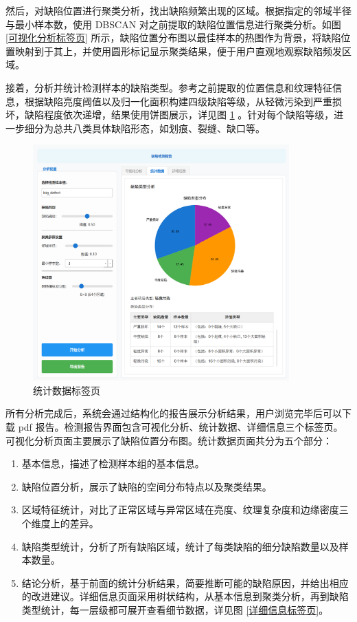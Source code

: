 \documentclass[
  ]{njuthesis}
\begin{document}
然后，对缺陷位置进行聚类分析，找出缺陷频繁出现的区域。根据指定的邻域半径与最小样本数，使用 DBSCAN 对之前提取的缺陷位置信息进行聚类分析。如图 \ref{可视化分析标签页} 所示，缺陷位置分布图以最佳样本的热图作为背景，将缺陷位置映射到于其上，并使用圆形标记显示聚类结果，便于用户直观地观察缺陷频发区域。

接着，分析并统计检测样本的缺陷类型。参考之前提取的位置信息和纹理特征信息，根据缺陷亮度阈值以及归一化面积构建四级缺陷等级，从轻微污染到严重损坏，缺陷程度依次递增，结果使用饼图展示，详见图 \ref{统计数据标签页} 。针对每个缺陷等级，进一步细分为总共八类具体缺陷形态，如划痕、裂缝、缺口等。

\begin{figure}[htb]
    \centering
    \includegraphics[width=0.88\textwidth]{images/统计数据标签页.png}
    \caption{统计数据标签页}
    \label{统计数据标签页}
\end{figure}

所有分析完成后，系统会通过结构化的报告展示分析结果，用户浏览完毕后可以下载 pdf 报告。检测报告界面包含可视化分析、统计数据、详细信息三个标签页。可视化分析页面主要展示了缺陷位置分布图。统计数据页面共分为五个部分：

\begin{enumerate}
    \item 基本信息，描述了检测样本组的基本信息。
    \item 缺陷位置分析，展示了缺陷的空间分布特点以及聚类结果。
    \item 区域特征统计，对比了正常区域与异常区域在亮度、纹理复杂度和边缘密度三个维度上的差异。
    \item 缺陷类型统计，分析了所有缺陷区域，统计了每类缺陷的细分缺陷数量以及样本数量。
    \item 结论分析，基于前面的统计分析结果，简要推断可能的缺陷原因，并给出相应的改进建议。详细信息页面采用树状结构，从基本信息到聚类分析，再到缺陷类型统计，每一层级都可展开查看细节数据，详见图 \ref{详细信息标签页}。
\end{enumerate}
\end{document}
